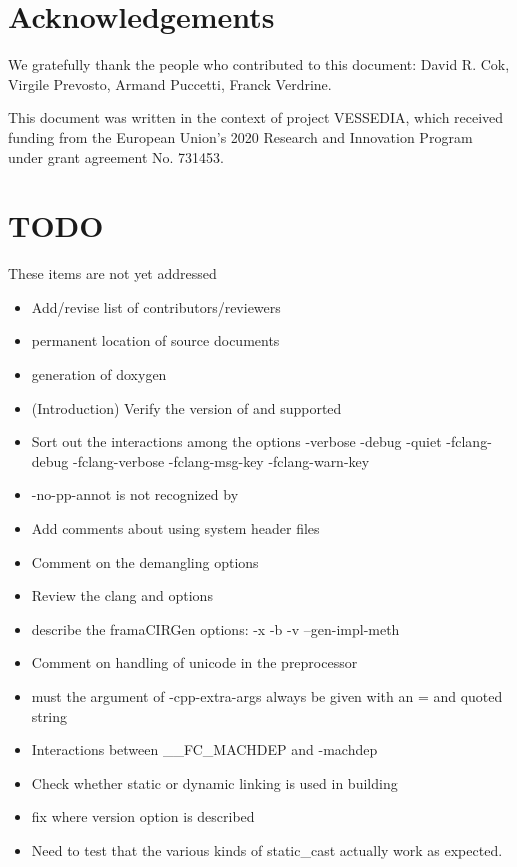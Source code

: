 \documentclass[web]{frama-c-book}
\begin{document}
\section*{Acknowledgements}

We gratefully thank the people who contributed to this document:
David R. Cok, Virgile Prevosto, Armand Puccetti, Franck Verdrine.

This document was written in the context of project VESSEDIA,
which received funding from the European Union's 2020
Research and Innovation Program under grant agreement
No. 731453.













\appendix



\section*{TODO}

These items are not yet addressed
\begin{itemize}
\item Add/revise list of contributors/reviewers
\item permanent location of source documents
\item generation of doxygen
\item (Introduction) Verify the version of \framac and \clang supported
\item Sort out the interactions among the options -verbose -debug -quiet -fclang-debug -fclang-verbose -fclang-msg-key -fclang-warn-key
\item -no-pp-annot is not recognized by \fclang
\item Add comments about using system header files
\item Comment on the demangling options
\item Review the clang and \irg options
\item describe the framaCIRGen options: -x -b -v --gen-impl-meth
\item Comment on handling of unicode in the preprocessor
\item must the argument of -cpp-extra-args always be given with an = and quoted string
\item Interactions between \_\_FC\_MACHDEP and -machdep
\item Check whether static or dynamic linking is used in building
\item fix where version option is described
\item Need to test that the various kinds of static\_cast actually work as expected.
\end{itemize}
\end{document}
